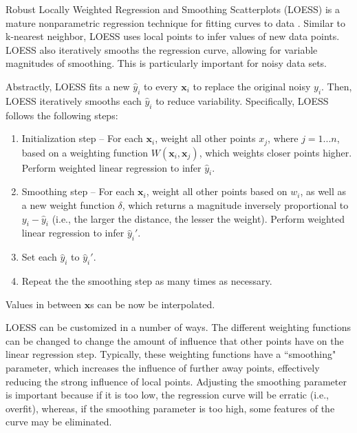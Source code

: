 Robust Locally Weighted Regression and Smoothing Scatterplots (LOESS) is a mature nonparametric regression technique for fitting curves to data   \cite{cleveland1979robust,cleveland1988locally}.
Similar to k-nearest neighbor, LOESS uses local points to infer values of new data points.
LOESS also iteratively smooths the regression curve, allowing for variable magnitudes of smoothing.
This is particularly important for noisy data sets.

Abstractly, LOESS fits a new $\hat y_i$ to every $\mathbf x_i$ to replace the original noisy $y_i$.
Then, LOESS iteratively smooths each $\hat y_i$ to reduce variability.
Specifically, LOESS follows the following steps:
\begin{enumerate}
   \item Initialization step -- For each $\mathbf x_i$, weight all other points $x_j$, where $j = 1...n$, based on a weighting function $W(\mathbf x_i, \mathbf x_j)$, which weights closer points higher. Perform weighted linear regression to infer $\hat y_i$.
   \item Smoothing step -- For each $\mathbf x_i$, weight all other points based on $w_i$, as well as a new weight function $\delta$, which returns a magnitude inversely proportional to $y_i - \hat y_i$ (i.e., the larger the distance, the lesser the weight). Perform weighted linear regression to infer $\hat y_i'$.
   \item Set each $\hat y_i$ to $\hat y_i'$.
   \item Repeat the the smoothing step as many times as necessary.
\end{enumerate}
Values in between $\mathbf x$s can be now be interpolated.

LOESS can be customized in a number of ways.
The different weighting functions can be changed to change the amount of influence that other points have on the linear regression step.
Typically, these weighting functions have a ``smoothing" parameter, which increases the influence of further away points, effectively reducing the strong influence of local points.
Adjusting the smoothing parameter is important because if it is too low, the regression curve will be erratic (i.e., overfit), whereas, if the smoothing parameter is too high, some features of the curve may be eliminated.


